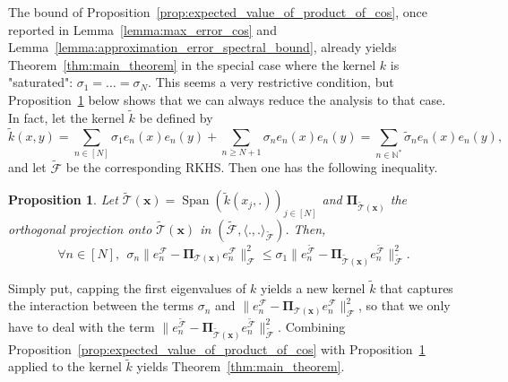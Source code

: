 \documentclass[twoside,11pt]{book}
\newtheorem{proposition}{Proposition}
\numberwithin{theorem}{chapter}
\numberwithin{definition}{chapter}
\numberwithin{proposition}{chapter}
\numberwithin{corollary}{chapter}
\numberwithin{example}{chapter}
\numberwithin{lemma}{chapter}
\numberwithin{assumption}{chapter}
\numberwithin{equation}{chapter}
\numberwithin{figure}{chapter}
\DeclareMathOperator{\Span}{\mathrm{Span}}
\begin{document}
The bound of Proposition~\ref{prop:expected_value_of_product_of_cos}, once reported in  Lemma~\ref{lemma:max_error_cos} and Lemma~\ref{lemma:approximation_error_spectral_bound}, already yields Theorem~\ref{thm:main_theorem} in the special case where the kernel $k$ is "saturated": $\sigma_{1} = \dots = \sigma_{N}$. This seems a very restrictive condition, but Proposition~\ref{prop:kernel_perturbation_inequality} below shows that we can always reduce the analysis to that case.
In fact, let the kernel $\tilde{k}$ be defined by
\begin{equation}\label{eq:tilde_k_kernel_definition}
\tilde{k}(x,y) = \sum\limits_{n \in [N]} \sigma_{1}e_{n}(x)e_{n}(y) + \sum\limits_{n \geq N+1} \sigma_{n}e_{n}(x)e_{n}(y) = \sum\limits_{n \in \mathbb{N}^{*}} \tilde{\sigma}_{n}e_{n}(x)e_{n}(y),
\end{equation}
and let $\tilde{\mathcal{F}}$ be the corresponding RKHS. Then one has the following inequality.
\begin{proposition}\label{prop:kernel_perturbation_inequality}
Let $ \tilde{\mathcal{T}}(\bm{x}) = \Span \left( \tilde{k}(x_{j},.) \right)_{j \in [N]}$ and $\bm{\Pi}_{\tilde{\mathcal{T}}(\bm{x})}$ the orthogonal projection onto $\tilde{\mathcal{T}}(\bm{x})$ in $(\tilde{\mathcal{F}}, \langle .,.\rangle_{\tilde{\mathcal{F}}})$. Then,
\begin{equation}\label{eq:kernel_perturbation_inequality}
	\forall n \in [N], \:\: \sigma_{n} \|e_{n}^{\mathcal{F}} - \bm{\Pi}_{\mathcal{T}(\bm{x})} e_{n}^{\mathcal{F}}\|_{\mathcal{F}}^{2} \leq \sigma_{1}   \|e_{n}^{\tilde{\mathcal{F}}} - \bm{\Pi}_{\tilde{\mathcal{T}}(\bm{x})} e_{n}^{\tilde{\mathcal{F}}}\|_{\tilde{\mathcal{F}}}^{2}.
\end{equation}
\end{proposition}
Simply put, capping the first eigenvalues of $k$ yields a new kernel $\tilde{k}$ that captures the interaction between the terms $\sigma_{n}$ and $\|e_{n}^{\mathcal{F}} - \bm{\Pi}_{\mathcal{T}(\bm{x})} e_{n}^{\mathcal{F}}\|_{\mathcal{F}}^{2}$, so that we only have to deal with the term $\|e_{n}^{\tilde{\mathcal{F}}} - \bm{\Pi}_{\tilde{\mathcal{T}}(\bm{x})} e_{n}^{\tilde{\mathcal{F}}}\|_{\tilde{\mathcal{F}}}^{2}$.
Combining  Proposition~\ref{prop:expected_value_of_product_of_cos} with Proposition~\ref{prop:kernel_perturbation_inequality} applied to the kernel $\tilde{k}$ yields Theorem~\ref{thm:main_theorem}. 
\end{document}
